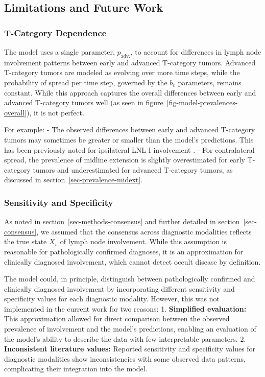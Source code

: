 \documentclass[
  sn-mathphys-num,
]{sn-jnl}
\begin{document}
\subsection{Limitations and Future
Work}\label{sec-discussion-limitations}

\subsubsection{T-Category Dependence}\label{t-category-dependence}

The model uses a single parameter, \(p_\text{adv.}\), to account for
differences in lymph node involvement patterns between early and
advanced T-category tumors. Advanced T-category tumors are modeled as
evolving over more time steps, while the probability of spread per time
step, governed by the \(b_v\) parameters, remains constant. While this
approach captures the overall differences between early and advanced
T-category tumors well (as seen in
figure~\ref{fig-model-prevalences-overall}), it is not perfect.

For example: - The observed differences between early and advanced
T-category tumors may sometimes be greater or smaller than the model's
predictions. This has been previously noted for ipsilateral LNL I
involvement \citep{ludwig_modelling_2023}. - For contralateral spread,
the prevalence of midline extension is slightly overestimated for early
T-category tumors and underestimated for advanced T-category tumors, as
discussed in section~\ref{sec-prevalence-midext}.

\subsubsection{Sensitivity and
Specificity}\label{sensitivity-and-specificity}

As noted in section~\ref{sec-methods-consensus} and further detailed in
section~\ref{sec-consensus}, we assumed that the consensus across
diagnostic modalities reflects the true state \(X_v\) of lymph node
involvement. While this assumption is reasonable for pathologically
confirmed diagnoses, it is an approximation for clinically diagnosed
involvement, which cannot detect occult disease by definition.

The model could, in principle, distinguish between pathologically
confirmed and clinically diagnosed involvement by incorporating
different sensitivity and specificity values for each diagnostic
modality. However, this was not implemented in the current work for two
reasons: 1. \textbf{Simplified evaluation:} This approximation allowed
for direct comparison between the observed prevalence of involvement and
the model's predictions, enabling an evaluation of the model's ability
to describe the data with few interpretable parameters. 2.
\textbf{Inconsistent literature values:} Reported sensitivity and
specificity values for diagnostic modalities show inconsistencies with
some observed data patterns, complicating their integration into the
model.
\end{document}
